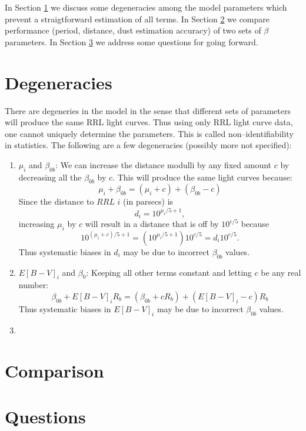 \documentclass[12pt]{article}
\begin{document}
In Section \ref{sec:nonident} we discuss some degeneracies among the model parameters which prevent a straigtforward estimation of all terms. In Section \ref{sec:compare} we compare performance (period, distance, dust estimation accuracy) of two sets of $\beta$ parameters. In Section \ref{sec:questions} we address some questions for going forward.

\section{Degeneracies}
\label{sec:nonident}

There are degeneries in the model in the sense that different sets of parameters will produce the same RRL light curves. Thus using only RRL light curve data, one cannot uniquely determine the parameters. This is called non--identifiability in statistics. The following are a few degeneracies (possibly more not specified):
\begin{enumerate}
\item $\mu_i$ and $\beta_{0b}$: We can increase the distance modulli by any fixed amount $c$ by decreasing all the $\beta_{0b}$ by $c$. This will produce the same light curves because:
  \begin{equation*}
    \mu_i + \beta_{0b} = (\mu_i + c) + (\beta_{0b}-c)
  \end{equation*}
  Since the distance to $RRL$ $i$ (in parsecs) is
  \begin{equation*}
    d_i = 10^{\mu_i/5 + 1},
  \end{equation*}
  increasing $\mu_i$ by $c$ will result in a distance that is off by $10^{c/5}$ because
  \begin{equation*}
   10^{(\mu_i + c)/5 + 1} = (10^{\mu_i/5 + 1})10^{c/5} = d_i10^{c/5}.
  \end{equation*}
  Thus systematic biases in $d_i$ may be due to incorrect $\beta_{0b}$ values.
\item $E[B-V]_i$ and $\beta_{0}$: Keeping all other terms constant and letting $c$ be any real number:
  \begin{equation*}
    \beta_{0b} + E[B-V]_iR_b = (\beta_{0b} + cR_b) + (E[B-V]_i-c)R_b
  \end{equation*}
  Thus systematic biases in $E[B-V]_i$ may be due to incorrect $\beta_{0b}$ values.
\item 
\end{enumerate}

\section{Comparison}
\label{sec:compare}


\section{Questions}
\label{sec:questions}



%
%
\end{document}
